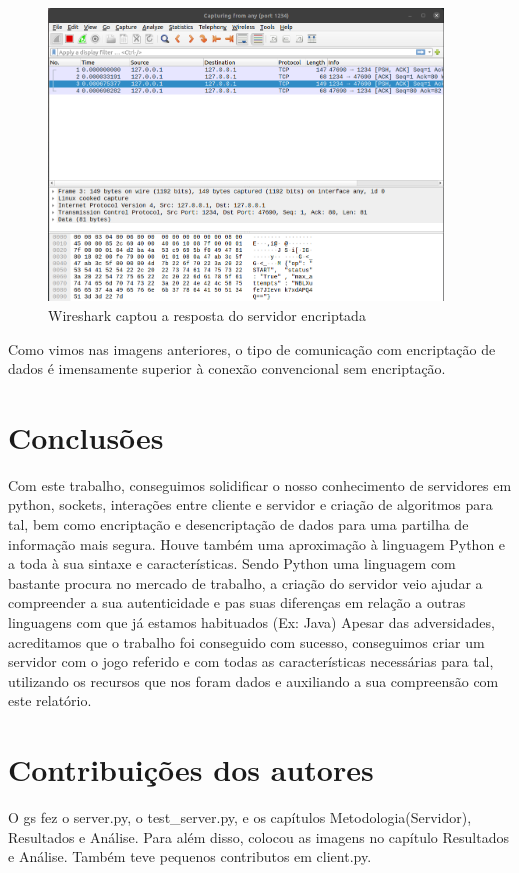 \documentclass{report}
\begin{document}
\begin{figure}[!h]
\center 
\includegraphics[height=220pt]{img/encripted/wireshark_start_response.png}
\caption{Wireshark captou a resposta do servidor encriptada}
\label{fig:wireshark_start_response_enc}
\end{figure}

Como vimos nas imagens anteriores, o tipo de comunicação com encriptação de dados é imensamente superior à conexão convencional sem encriptação.


\chapter{Conclusões}
\label{chap.conclusao}
Com este trabalho, conseguimos solidificar o nosso conhecimento de servidores em python, sockets, interações entre 
cliente e servidor e criação de algoritmos para tal, bem como encriptação e desencriptação de dados para uma partilha
de informação mais segura. Houve também uma aproximação à linguagem Python e a toda à sua sintaxe e características.
Sendo Python uma linguagem com bastante procura no mercado de trabalho, a criação do servidor veio ajudar a compreender
a sua autenticidade e pas suas diferenças em relação a outras linguagens com que já estamos habituados (Ex: Java)
Apesar das adversidades, acreditamos que o trabalho foi conseguido com sucesso, conseguimos criar um servidor 
com o jogo referido e com todas as características necessárias para tal, utilizando os recursos que nos foram dados
e auxiliando a sua compreensão com este relatório.

\chapter*{Contribuições dos autores}
O \ac{gs} fez o server.py, o test\_server.py, e os capítulos Metodologia(Servidor), Resultados e Análise. Para além disso, colocou as imagens no capítulo Resultados e Análise. Também teve pequenos contributos em client.py.
\end{document}
